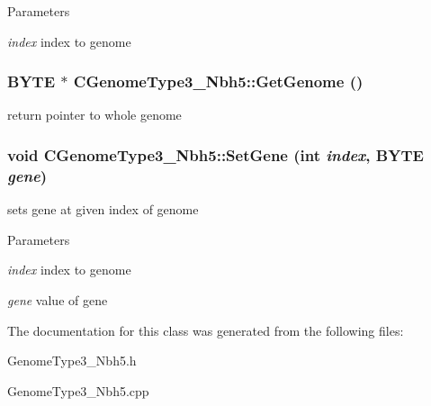 \begin{DoxyParams}{Parameters}
\item[{\em index}]index to genome \end{DoxyParams}
\hypertarget{classCGenomeType3__Nbh5_a42a24d3581a7779622c0871a92a0f97e}{
\subsubsection[{GetGenome}]{\setlength{\rightskip}{0pt plus 5cm}BYTE $\ast$ CGenomeType3\_\-Nbh5::GetGenome ()}}
\label{classCGenomeType3__Nbh5_a42a24d3581a7779622c0871a92a0f97e}
return pointer to whole genome \hypertarget{classCGenomeType3__Nbh5_ab1f7ad4c4653cad4838444fc2a5d6da4}{
\subsubsection[{SetGene}]{\setlength{\rightskip}{0pt plus 5cm}void CGenomeType3\_\-Nbh5::SetGene (int {\em index}, \/  BYTE {\em gene})}}
\label{classCGenomeType3__Nbh5_ab1f7ad4c4653cad4838444fc2a5d6da4}
sets gene at given index of genome


\begin{DoxyParams}{Parameters}
\item[{\em index}]index to genome \item[{\em gene}]value of gene \end{DoxyParams}


The documentation for this class was generated from the following files:\begin{DoxyCompactItemize}
\item 
GenomeType3\_\-Nbh5.h\item 
GenomeType3\_\-Nbh5.cpp\end{DoxyCompactItemize}
